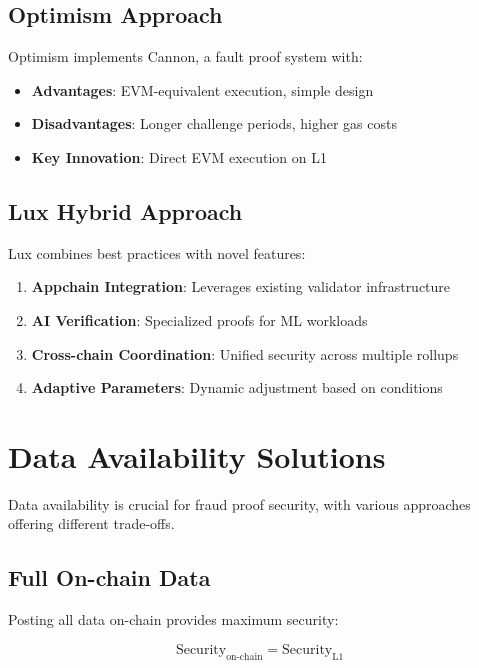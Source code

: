 \documentclass[11pt,a4paper]{article}
\theoremstyle{definition}
\begin{document}
\subsection{Optimism Approach}

Optimism implements Cannon, a fault proof system with:

\begin{itemize}
    \item \textbf{Advantages}: EVM-equivalent execution, simple design
    \item \textbf{Disadvantages}: Longer challenge periods, higher gas costs
    \item \textbf{Key Innovation}: Direct EVM execution on L1
\end{itemize}

\subsection{Lux Hybrid Approach}

Lux combines best practices with novel features:

\begin{enumerate}
    \item \textbf{Appchain Integration}: Leverages existing validator infrastructure
    \item \textbf{AI Verification}: Specialized proofs for ML workloads
    \item \textbf{Cross-chain Coordination}: Unified security across multiple rollups
    \item \textbf{Adaptive Parameters}: Dynamic adjustment based on conditions
\end{enumerate}

\section{Data Availability Solutions}

Data availability is crucial for fraud proof security, with various approaches offering different trade-offs.

\subsection{Full On-chain Data}

Posting all data on-chain provides maximum security:

\begin{equation}
\text{Security}_{\text{on-chain}} = \text{Security}_{\text{L1}}
\end{equation}
\end{document}
